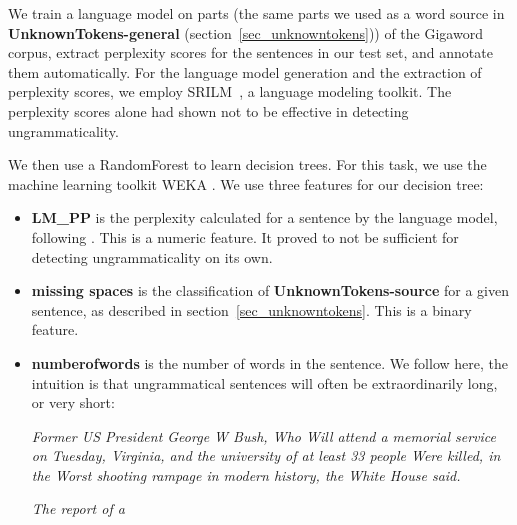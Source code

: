\documentclass[a4paper,10pt]{scrartcl}
\theoremstyle{style}
\begin{document}
We train a language model on parts (the same parts we used as a word source in \textbf{UnknownTokens-general} (section~\ref{sec_unknowntokens})) of the Gigaword corpus\citep{gigaword}, extract perplexity scores for the sentences in our test set, and annotate them automatically. For the language model generation and the extraction of perplexity scores, we employ SRILM~\citep{stolcke2002srilm}, a language modeling toolkit. The perplexity scores alone had shown not to be effective in detecting ungrammaticality.


We then use a RandomForest \citep{breiman2001random} to learn decision trees. For this task, we use the machine learning toolkit WEKA \citep{hall2009weka}.
We use three features for our decision tree:

\begin{itemize}
	\item \textbf{LM\_PP} is the perplexity calculated for a sentence by the language model, following \cite{sun2007detecting}. This is a numeric feature. It proved to not be sufficient for detecting ungrammaticality on its own.
	\item \textbf{missing spaces} is the classification of \textbf{UnknownTokens-source} for a given sentence, as described in section~\ref{sec_unknowntokens}. This is a binary feature.
	\item \textbf{numberofwords} is the number of words in the sentence. We follow \cite{wagner2007comparative} here, the intuition is that ungrammatical sentences will often be extraordinarily long, or very short:

		\textit{Former US President George W Bush, Who Will attend a memorial service on Tuesday, Virginia, and the university of at least 33 people Were killed, in the Worst shooting rampage in modern history, the White House said.}

		\textit{The report of a}
\end{itemize}


\end{document}
